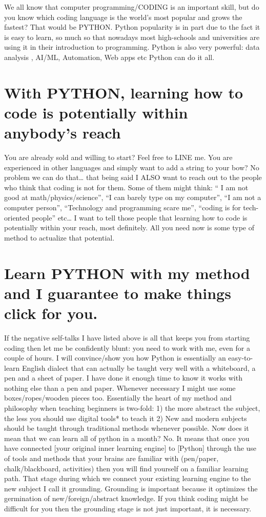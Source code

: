 \documentclass[11pt]{article}
\begin{document}
We all know that computer programming/CODING is an important skill, but do you know which coding language is the world’s most popular and grows the fastest? That would be PYTHON.
Python popularity is in part due to the fact it is easy to learn, so much so that nowadays most high-schools and universities are using it in their introduction to programming.
Python is also very powerful: data analysis , AI/ML, Automation, Web apps etc Python can do it all.

\section{With PYTHON, learning how to code is potentially within anybody’s reach}
\label{sec:org7ceb3a7}
You are already sold and willing to start? Feel free to LINE me.
You are experienced in other languages and simply want to add a string to your bow? No problem we can do that… that being said I ALSO want to reach out to the people who think that coding is not for them. Some of them might think: “ I am not good at math/physics/science”, “I can barely type on my computer”, “I am not a computer person”, “Technology and programming scare me”, “coding is for tech-oriented people” etc…
I want to tell those people that learning how to code is potentially within your reach, most definitely. All you need now is some type of method to actualize that potential.

\section{Learn PYTHON with my method and I guarantee to make things click for you.}
\label{sec:org7c3639b}
If the negative self-talks I have listed above is all that keeps you from starting coding then let me be confidently blunt: you need to work with me, even for a couple of hours.
I will convince/show you how Python is essentially an easy-to-learn English dialect that can actually be taught very well with a whiteboard, a pen and a sheet of paper.  I have done it enough time to know it works with nothing else than a pen and paper. Whenever necessary I might use some boxes/ropes/wooden pieces too. Essentially the heart of my method and philosophy when teaching beginners is two-fold: 1) the more abstract the subject, the less you should use digital tools* to teach it 2) New and modern subjects should be taught  through traditional methods whenever possible.
Now does it mean that we can learn all of python in a month? No. It means that once you have connected [your original inner learning engine] to [Python] through the use of tools and methods that your brains are familiar with (pen/paper, chalk/blackboard, activities) then you will find yourself on a familiar learning path.
That stage during which we connect your existing learning engine to the new subject I call it grounding. Grounding is important because it optimizes the germination of new/foreign/abstract knowledge. If you think coding might be difficult for you then the grounding stage is not just important, it is necessary.
\end{document}
